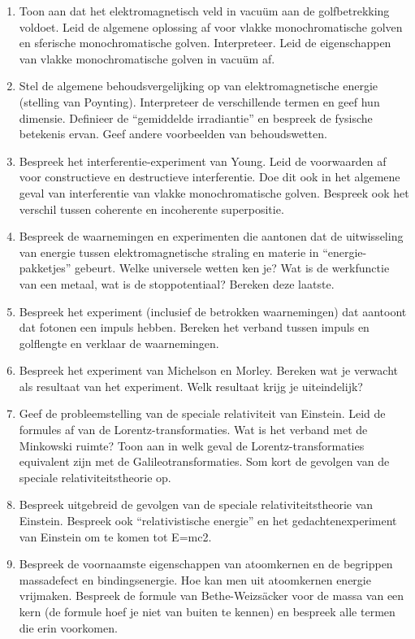 \documentclass[12pt]{article}
\begin{document}
\begin{enumerate}
        \item Toon aan dat het elektromagnetisch veld in vacuüm aan de golfbetrekking voldoet.  Leid de algemene oplossing af voor vlakke mono­chroma­tische golven en sferische mono­chroma­tische golven. Interpreteer. Leid de eigenschappen van vlakke monochromatische golven in vacuüm af.
        \item Stel de algemene behoudsvergelijking op van elektromagnetische energie (stelling van Poynting).  Interpreteer de verschillende termen en geef hun dimensie. Definieer de “gemiddelde irradiantie” en bespreek de fysische betekenis ervan. Geef andere voorbeelden van behoudswetten.
        \item Bespreek het interferentie-experiment van Young. Leid de voorwaarden af voor constructieve en destructieve interferentie. Doe dit ook in het algemene geval van interferentie van vlakke monochromatische golven. Bespreek ook het verschil tussen coherente en incoherente superpositie.
        \item Bespreek de waarnemingen en experimenten die aantonen dat de uitwisseling van energie tussen elektromagnetische straling en materie in “energie-pakketjes” gebeurt. Welke universele wetten ken je?  Wat is de werkfunctie van een metaal, wat is de stoppotentiaal? Bereken deze laatste.
        \item Bespreek het experiment (inclusief de betrokken waarnemingen) dat aantoont dat fotonen een impuls hebben. Bereken het verband tussen impuls en golflengte en verklaar de waarnemingen.
        \item Bespreek het experiment van Michelson en Morley. Bereken wat je verwacht als resultaat van het experiment. Welk resultaat krijg je uiteindelijk?
        \item Geef de probleemstelling van de speciale relativiteit van Einstein. Leid de formules af van de Lorentz-transformaties. Wat is het verband met de Minkowski ruimte?  Toon aan in welk geval de Lorentz-transformaties equivalent zijn met de Galileotransformaties. Som kort de gevolgen van de speciale relativiteitstheorie op.
        \item Bespreek uitgebreid de gevolgen van de speciale relativiteitstheorie van Einstein. Bespreek ook “relativistische energie” en het gedachtenexperiment van Einstein om te komen tot E=mc2.
        \item Bespreek de voornaamste eigenschappen van atoomkernen en de begrippen massadefect en bindingsenergie. Hoe kan men uit atoomkernen energie vrijmaken. Bespreek de formule van Bethe-Weizsäcker voor de massa van een kern (de formule hoef je niet van buiten te kennen) en bespreek alle termen die erin voorkomen.

\end{enumerate}
\end{document}
